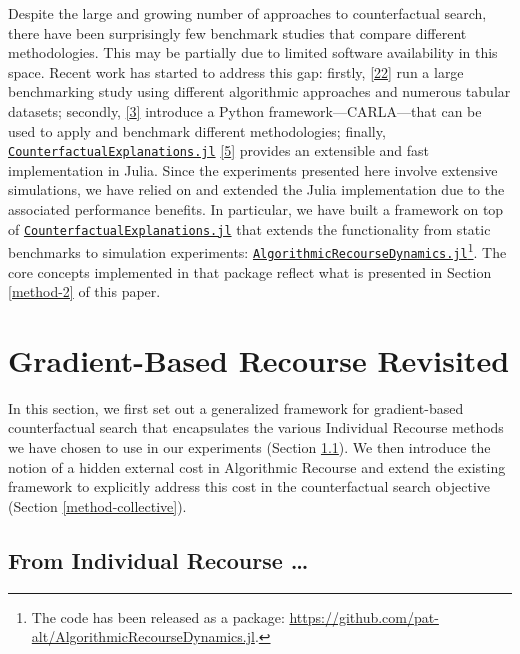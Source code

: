 \documentclass[conference,final,]{IEEEtran}
\theoremstyle{definition}
\theoremstyle{definition}
\theoremstyle{definition}
\theoremstyle{definition}
\theoremstyle{remark}
\begin{document}
Despite the large and growing number of approaches to counterfactual search, there have been surprisingly few benchmark studies that compare different methodologies. This may be partially due to limited software availability in this space. Recent work has started to address this gap: firstly, \protect\hyperlink{ref-deoliveira2021framework}{{[}22{]}} run a large benchmarking study using different algorithmic approaches and numerous tabular datasets; secondly, \protect\hyperlink{ref-pawelczyk2021carla}{{[}3{]}} introduce a Python framework---CARLA---that can be used to apply and benchmark different methodologies; finally, \href{https://github.com/pat-alt/CounterfactualExplanations.jl}{\texttt{CounterfactualExplanations.jl}} \protect\hyperlink{ref-altmeyer2022counterfactualexplanations}{{[}5{]}} provides an extensible and fast implementation in Julia. Since the experiments presented here involve extensive simulations, we have relied on and extended the Julia implementation due to the associated performance benefits. In particular, we have built a framework on top of \href{https://github.com/pat-alt/CounterfactualExplanations.jl}{\texttt{CounterfactualExplanations.jl}} that extends the functionality from static benchmarks to simulation experiments: \href{(https://github.com/pat-alt/AlgorithmicRecourseDynamics.jl)}{\texttt{AlgorithmicRecourseDynamics.jl}}\footnote{The code has been released as a package: \url{https://github.com/pat-alt/AlgorithmicRecourseDynamics.jl}.}. The core concepts implemented in that package reflect what is presented in Section \ref{method-2} of this paper.

\hypertarget{method}{%
\section{Gradient-Based Recourse Revisited}\label{method}}

In this section, we first set out a generalized framework for gradient-based counterfactual search that encapsulates the various Individual Recourse methods we have chosen to use in our experiments (Section \ref{method-general}). We then introduce the notion of a hidden external cost in Algorithmic Recourse and extend the existing framework to explicitly address this cost in the counterfactual search objective (Section \ref{method-collective}).

\hypertarget{method-general}{%
\subsection{From Individual Recourse \ldots{}}\label{method-general}}
\end{document}
